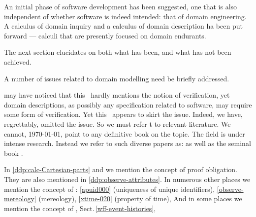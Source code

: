 
\label{chap7.tex.1}\label{chapter:Closing}
\pos{\minitoc}{}



\begynd
\pind An initial phase of software development has been suggested, one
      that is also independent of whether software is indeed intended:
      that of domain engineering.
\begynd
\pind A calculus of domain inquiry and a calculus of domain
      description ha been put forward --- 
\pind calculi that are presently focused on domain endurants.
\afslut
\afslut


The next section elucidates on both what has been, and what has not
been achieved. 


\begynd
\pind A number of issues related to domain modelling need be briefly addressed.
\afslut

\LLLL

\begynd 
\pind {} may have noticed \nyl
      that this \primer\ hardly mentions the notion of verification,
\begynd
\pind yet domain descriptions, \nyl as possibly any specification related
      to software, 
\pind may require some form of verification.
\afslut
\pind Yet this \primer\ appears to skirt the issue.
\pind Indeed, we have, regrettably, omitted the issue.
\pind So we must refer t  to relevant literature.
\pind We cannot, \today, point to any definitive book on the topic.
\pind The field is under intense research.
\pind Instead we refer to
\begynd 
\pind  such diverse papers as:\cite{CPAIOR:Nikolaj:2021,AdvCafeOBJ2022}
\pind  as well as the seminal book \cite{PatrickCousot2021}.
\afslut
\afslut

\mnewfoil
  
\begynd
\pind In 
      \vref{ddp:calc-Cartesian-parts} and  we mention the
      concept of proof obligation. They are also mentioned in
       \vref{ddp:observe-attributes}. 
\pind In numerous other places we mention the concept of :
      \vref{apuid000} (uniqueness of unique identifiers),
      \vref{observe-mereology} (mereology),
      \vref{xtime-020} (property of time),
\pind And in some places we mention  the concept of
       , Sect.\,\vref{wff-event-histories},
\afslut
 
